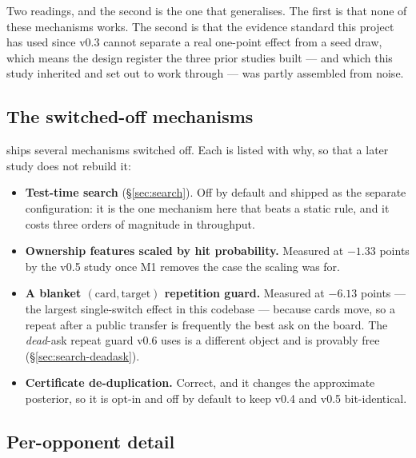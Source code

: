 Two readings, and the second is the one that generalises. The first is that none of these mechanisms
works. The second is that the evidence standard this project has used since v0.3 cannot separate a
real one-point effect from a seed draw, which means the design register the three prior studies
built --- and which this study inherited and set out to work through --- was partly assembled from
noise.

\subsection{The switched-off mechanisms}
\label{app:abl-off}

\vsix{} ships several mechanisms switched off. Each is listed with why, so that a later study does
not rebuild it:

\begin{itemize}
\item \textbf{Test-time search} (\S\ref{sec:search}). Off by default and shipped as the separate
  \vsixsearch{} configuration: it is the one mechanism here that beats a static rule, and it costs
  three orders of magnitude in throughput.
\item \textbf{Ownership features scaled by hit probability.} Measured at $-1.33$ points by the v0.5
  study once M1 removes the case the scaling was for.
\item \textbf{A blanket $(\text{card},\text{target})$ repetition guard.} Measured at $-6.13$ points
  --- the largest single-switch effect in this codebase --- because cards move, so a repeat after a
  public transfer is frequently the best ask on the board. The \emph{dead}-ask repeat guard v0.6
  uses is a different object and is provably free (\S\ref{sec:search-deadask}).
\item \textbf{Certificate de-duplication.} Correct, and it changes the approximate posterior, so it
  is opt-in and off by default to keep v0.4 and v0.5 bit-identical.
\end{itemize}

\subsection{Per-opponent detail}
\label{app:abl-peropponent}

\begin{table}[h]\centering
\caption{Paired ablations against \vsix{} over the six-opponent panel.}
\label{tab:abl-full}

\end{table}

